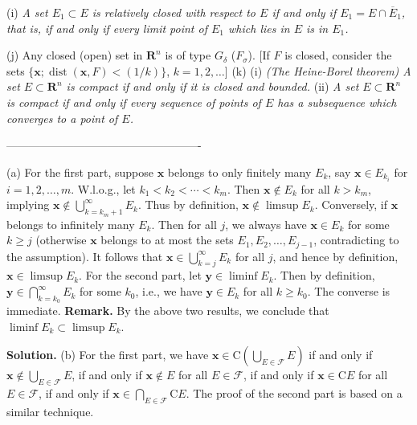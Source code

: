 \documentclass[12pt]{article}
\theoremstyle{definition}
\begin{document}
(i) 
\textit{A set $E_1\subset E$ is relatively closed with respect to $E$ if and only if $E_1=E\cap\overline{E}_1$, that is, if and only if every limit point of $E_1$ which lies in $E$ is in $E_1$.}

(j) Any closed (open) set in $\mathbf{R}^n$ is of type $G_\delta$ ($F_\sigma$). [If $F$ is closed, consider the sets $\{\mathbf{x};\operatorname{dist}(\mathbf{x},F)<(1/k)\}$, $k=1,2,\ldots$]
(k) 
(i) \textit{(The Heine-Borel theorem) A set $E\subset\mathbf{R}^n$ is compact if and only if it is closed and bounded.}
(ii) \textit{A set $E\subset\mathbf{R}^n$ is compact if and only if every sequence of points of $E$ has a subsequence which converges to a point of $E$.}

----------------------------------------------------

(a) For the first part, suppose $\mathbf{x}$ belongs to only finitely many $E_k$, say $\mathbf{x}\in E_{k_i}$ for $i=1,2,\ldots,m$. W.l.o.g., let $k_1<k_2<\cdots<k_m$. Then $\mathbf{x}\notin E_k$ for all $k>k_m$, implying $\mathbf{x}\notin\bigcup_{k=k_m+1}^\infty E_k$. Thus by definition, $\mathbf{x}\notin\limsup E_k$. Conversely, if $\mathbf{x}$ belongs to infinitely many $E_k$. Then for all $j$, we always have $\mathbf{x}\in E_k$ for some $k\ge j$ (otherwise $\mathbf{x}$ belongs to at most the sets $E_1,E_2,\ldots,E_{j-1}$, contradicting to the assumption). It follows that $\mathbf{x}\in\bigcup_{k=j}^\infty E_k$ for all $j$, and hence by definition, $\mathbf{x}\in\limsup E_k$. For the second part, let $\mathbf{y}\in \liminf E_k$. Then by definition, $\mathbf{y}\in\bigcap_{k=k_0}^\infty E_k$ for some $k_0$, i.e., we have $\mathbf{y}\in E_k$ for all $k\ge k_0$. The converse is immediate.
\textbf{Remark.} By the above two results, we conclude that $\liminf E_k\subset\limsup E_k$.

\smallskip
\noindent\textbf{Solution.}\quad
(b) For the first part, we have $\mathbf{x}\in\mathrm{C}\left(\bigcup_{E\in\mathcal{F}}E\right)$ if and only if $\mathbf{x}\notin\bigcup_{E\in\mathcal{F}}E$, if and only if $\mathbf{x}\notin E$ for all $E\in\mathcal{F}$, if and only if $\mathbf{x}\in \mathrm{C}E$ for all $E\in\mathcal{F}$, if and only if $\mathbf{x}\in\bigcap_{E\in\mathcal{F}}\mathrm{C}E$. The proof of the second part is based on a similar technique.
\end{document}
